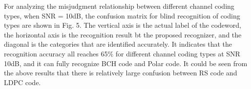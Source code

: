 \documentclass[conference]{IEEEtran}
\begin{document}
For analyzing the misjudgment relationship between different channel coding types, when SNR = 10dB, the confusion matrix for blind recognition of coding types are shown in Fig. 5. The vertical axis is the actual label of the codeword, the horizontal axis is the recognition result bt the proposed recognizer, and the diagonal is the categories that are identified accurately. It indicates that the recognition accuracy all reaches 65\% for different channel coding types at SNR 10dB, and it can fully recognize BCH code and Polar code. It could be seen from the above results that there is relatively large confusion between RS code and LDPC code.

\begin{figure}[tbp]
	\centerline{
	}
	\centerline{
}
\end{figure}
\end{document}
